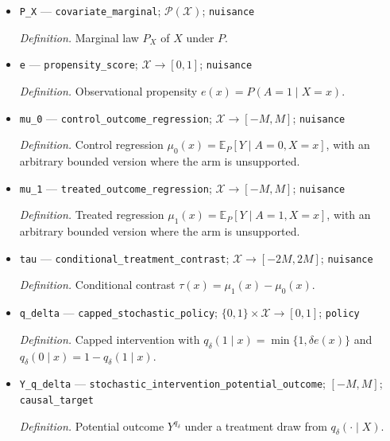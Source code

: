 \documentclass{article}
\begin{document}
\begin{itemize}
  \par\smallskip\noindent\emph{Definition.} Law \(P\) of one observed unit.
  \item \texttt{P\_\allowbreak{}X} --- \texttt{covariate\_\allowbreak{}marginal}; \(\mathcal P(\mathcal X)\); \texttt{nuisance}
  \par\smallskip\noindent\emph{Definition.} Marginal law \(P_X\) of \(X\) under \(P\).
  \item \texttt{e} --- \texttt{propensity\_\allowbreak{}score}; \(\mathcal X\to[0,1]\); \texttt{nuisance}
  \par\smallskip\noindent\emph{Definition.} Observational propensity \(e(x)=P(A=1\mid X=x)\).
  \item \texttt{mu\_\allowbreak{}0} --- \texttt{control\_\allowbreak{}outcome\_\allowbreak{}regression}; \(\mathcal X\to[-M,M]\); \texttt{nuisance}
  \par\smallskip\noindent\emph{Definition.} Control regression \(\mu_0(x)=\mathbb E_P[Y\mid A=0,X=x]\), with an arbitrary bounded version where the arm is unsupported.
  \item \texttt{mu\_\allowbreak{}1} --- \texttt{treated\_\allowbreak{}outcome\_\allowbreak{}regression}; \(\mathcal X\to[-M,M]\); \texttt{nuisance}
  \par\smallskip\noindent\emph{Definition.} Treated regression \(\mu_1(x)=\mathbb E_P[Y\mid A=1,X=x]\), with an arbitrary bounded version where the arm is unsupported.
  \item \texttt{tau} --- \texttt{conditional\_\allowbreak{}treatment\_\allowbreak{}contrast}; \(\mathcal X\to[-2M,2M]\); \texttt{nuisance}
  \par\smallskip\noindent\emph{Definition.} Conditional contrast \(\tau(x)=\mu_1(x)-\mu_0(x)\).
  \item \texttt{q\_\allowbreak{}delta} --- \texttt{capped\_\allowbreak{}stochastic\_\allowbreak{}policy}; \(\{0,1\}\times\mathcal X\to[0,1]\); \texttt{policy}
  \par\smallskip\noindent\emph{Definition.} Capped intervention with \(q_\delta(1\mid x)=\min\{1,\delta e(x)\}\) and \(q_\delta(0\mid x)=1-q_\delta(1\mid x)\).
  \item \texttt{Y\_\allowbreak{}q\_\allowbreak{}delta} --- \texttt{stochastic\_\allowbreak{}intervention\_\allowbreak{}potential\_\allowbreak{}outcome}; \([-M,M]\); \texttt{causal\_\allowbreak{}target}
  \par\smallskip\noindent\emph{Definition.} Potential outcome \(Y^{q_\delta}\) under a treatment draw from \(q_\delta(\cdot\mid X)\).

\end{itemize}
\end{document}
